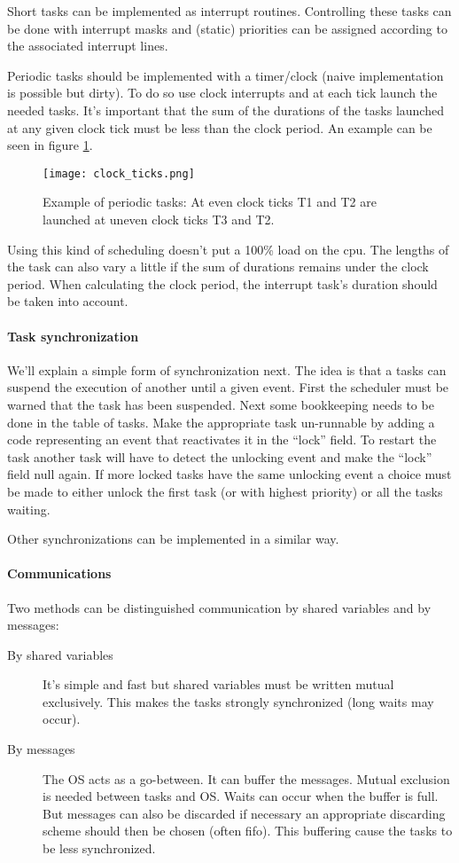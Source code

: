 \documentclass[../main.tex]{subfiles}
\begin{document}
Short tasks can be implemented as interrupt routines. 
Controlling these tasks can be done with interrupt masks and (static) priorities can be assigned according to the associated interrupt lines.

Periodic tasks should be implemented with a timer/clock (naive implementation is possible but dirty).
To do so use clock interrupts and at each tick launch the needed tasks.
It's important that the sum of the durations of the tasks launched at any given clock tick must be less than the clock period. 
An example can be seen in figure \ref{f:perd_ex}.

\begin{figure}[H]
	\centering
	\texttt{[image: clock\_ticks.png]}
	\caption{Example of periodic tasks: At even clock ticks T1 and T2 are launched at uneven clock ticks T3 and T2.}
	\label{f:perd_ex}
\end{figure}

Using this kind of scheduling doesn't put a 100\% load on the cpu.
The lengths of the task can also vary a little if the sum of durations remains under the clock period.
When calculating the clock period, the interrupt task's duration should be taken into account.

\paragraph{Task synchronization}
We'll explain a simple form of synchronization next. 
The idea is that a tasks can suspend the execution of another until a given event.
First the scheduler must be warned that the task has been suspended.
Next some bookkeeping needs to be done in the table of tasks.
Make the appropriate task un-runnable by adding a code representing an event that reactivates it in the ``lock'' field.
To restart the task another task will have to detect the unlocking event and make the ``lock'' field null again. 
If more locked tasks have the same unlocking event a choice must be made to either unlock the first task (or with highest priority) or all the tasks waiting. 

Other synchronizations can be implemented in a similar way.

\paragraph{Communications}
Two methods can be distinguished communication by shared variables and by messages:
\begin{description}
	\item[By shared variables] It's simple and fast but shared variables must be written mutual exclusively. This makes the tasks strongly synchronized (long waits may occur).
	\item[By messages] The OS acts as a go-between. It can buffer the messages. Mutual exclusion is needed between tasks and OS. Waits can occur when the buffer is full. But messages can also be discarded if necessary an appropriate discarding scheme should then be chosen (often fifo). This buffering cause the tasks to be less synchronized.
\end{description} 
\end{document}
